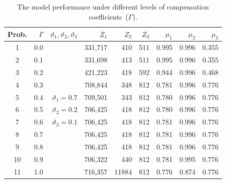 \documentclass[10pt,twocolumn]{article}
\newcommand{\tabfont}{\fontsize{8}{9.5}\selectfont}
\newcommand{\headfont}{\fontsize{8.5}{10}\selectfont\bfseries}
\begin{document}
\begin{table}[H]
\caption{The model performance under different levels of
compensation coefficients~($\Gamma$).}
\label{tab:gamma}
\tabfont
\setlength{\tabcolsep}{3pt}
\begin{tabular}{crrrrrrrr}
\toprule
\headfont Prob. & $\Gamma$ & $\vartheta_1,\vartheta_2,\vartheta_3$
  & $Z_1$ & $Z_2$ & $Z_3$
  & $\mu_1$ & $\mu_2$ & $\mu_3$ \\
\midrule
1 & 0.0 &              & 331,717 & 410 & 511 & 0.995 & 0.996 & 0.355 \\
2 & 0.1 &              & 331,698 & 413 & 511 & 0.995 & 0.996 & 0.355 \\
3 & 0.2 &              & 421,223 & 418 & 592 & 0.944 & 0.996 & 0.468 \\
4 & 0.3 &              & 708,844 & 348 & 812 & 0.781 & 0.996 & 0.776 \\
5 & 0.4 & $\vartheta_1=0.7$& 709,501 & 343 & 812 & 0.780 & 0.996 & 0.776 \\
6 & 0.5 & $\vartheta_2=0.2$ & 706,425 & 418 & 812 & 0.780 & 0.996 & 0.776 \\
7 & 0.6 & $\vartheta_3=0.1$ & 706,425 & 418 & 812 & 0.781 & 0.996 & 0.776 \\
8 & 0.7 &              & 706,425 & 418 & 812 & 0.781 & 0.996 & 0.776 \\
9 & 0.8 &              & 706,425 & 418 & 812 & 0.781 & 0.996 & 0.776 \\
10& 0.9 &              & 706,322 & 440 & 812 & 0.781 & 0.995 & 0.776 \\
11& 1.0 &              & 716,357 & 11884 & 812 & 0.776 & 0.874 & 0.776 \\
\bottomrule
\end{tabular}
\end{table}

\end{document}
